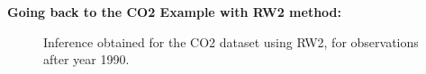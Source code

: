\documentclass{beamer} %
\begin{document}
\begin{frame}
\textbf{Going back to the CO2 Example with RW2 method:}
\begin{figure}[p]
    \centering
     \caption{Inference obtained for the CO2 dataset using RW2, for observations after year 1990.}
    \label{fig:realdata_1990}
\end{figure}
\end{frame}
\end{document}
